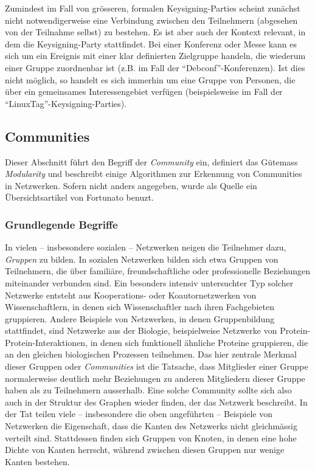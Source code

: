 Zumindest im Fall von gr\"osseren, formalen Keysigning-Parties scheint
zun\"achst nicht notwendigerweise eine Verbindung zwischen den
Teilnehmern (abgesehen von der Teilnahme selbst) zu bestehen. Es ist
aber auch der Kontext relevant, in dem die Keysigning-Party
stattfindet. Bei einer Konferenz oder Messe kann es sich um ein
Ereignis mit einer klar definierten Zielgruppe handeln, die wiederum
einer Gruppe zuordnenbar ist (z.B. im Fall der
``Debconf''-Konferenzen). Ist dies nicht m\"oglich, so handelt es sich
immerhin um eine Gruppe von Personen, die \"uber ein gemeinsames
Interessengebiet verf\"ugen (beispielsweise im Fall der
``LinuxTag''-Keysigning-Parties).

\subsection{Communities}
\label{ch:Grundlagen:sec:Netzwerkanalyse:subsec:Communities}

Dieser Abschnitt f\"uhrt den Begriff der \emph{Community} ein,
definiert das G\"utemass \emph{Modularity} und beschreibt einige
Algorithmen zur Erkennung von Communities in Netzwerken. Sofern nicht
anders angegeben, wurde als Quelle ein \"Ubersichtsartikel von
Fortunato \cite{Fortunato2010} benuzt.

\subsubsection{Grundlegende Begriffe}
\label{sec:grundl-begr}

In vielen -- insbesondere sozialen -- Netzwerken neigen die Teilnehmer
dazu, \emph{Gruppen} zu bilden. In sozialen Netzwerken bilden sich
etwa Gruppen von Teilnehmern, die \"uber famili\"are,
freundschaftliche oder professionelle Beziehungen miteinander
verbunden sind. Ein besonders intensiv untersuchter Typ solcher
Netzwerke entsteht aus Kooperations- oder Koautornetzwerken von
Wissenschaftlern, in denen sich Wissenschaftler nach ihren
Fachgebieten gruppieren. Andere Beispiele von Netzwerken, in denen
Gruppenbildung stattfindet, sind Netzwerke aus der Biologie,
beispielweise Netzwerke von Protein-Protein-Interaktionen, in denen
sich funktionell \"ahnliche Proteine gruppieren, die an den gleichen
biologischen Prozessen teilnehmen. Das hier zentrale Merkmal dieser
Gruppen oder \emph{Communities} ist die Tatsache, dass Mitglieder
einer Gruppe normalerweise deutlich mehr Beziehungen zu anderen
Mitgliedern dieser Gruppe haben als zu Teilnehmern ausserhalb. Eine
solche Community sollte sich also auch in der Struktur des Graphen
wieder finden, der das Netzwerk beschreibt. In der Tat teilen viele --
insbesondere die oben angef\"uhrten -- Beispiele von Netzwerken die
Eigenschaft, dass die Kanten des Netzwerks nicht gleichm\"assig
verteilt sind. Stattdessen finden sich Gruppen von Knoten, in denen
eine hohe Dichte von Kanten herrscht, w\"ahrend zwischen diesen
Gruppen nur wenige Kanten bestehen.

